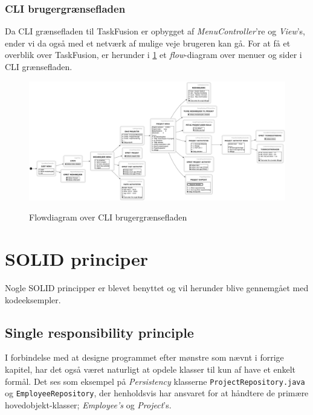 \subsubsection{CLI brugergrænsefladen}
Da CLI grænsefladen til TaskFusion er opbygget af \textit{MenuController}'re og \textit{View}'s, ender vi da også med et netværk af mulige veje brugeren kan gå. For at få et overblik over TaskFusion, er herunder i \ref{fig:flow_cli} et \textit{flow}-diagram over menuer og sider i CLI grænsefladen.  
\begin{figure}[H]
    \centering
    \caption{Flowdiagram over CLI brugergrænsefladen}
    \includegraphics[width = \textwidth, keepaspectratio]{TaskFusion/out/assets/diagrams/flow_cli/flow_cli.png}
    \label{fig:flow_cli}
\end{figure}



\section{SOLID principer}
Nogle SOLID principper er blevet benyttet og vil herunder blive gennemgået med kodeeksempler.

\subsection{Single responsibility principle}
I forbindelse med at designe programmet efter mønstre som nævnt i forrige kapitel, har det også været naturligt at opdele klasser til kun af have et enkelt formål. Det ses som eksempel på \textit{Persistency} klasserne \texttt{ProjectRepository.java} og \texttt{EmployeeRepository}, der henholdsvis har ansvaret for at håndtere de primære hovedobjekt-klasser; \textit{Employee's} og \textit{Project}'s.

